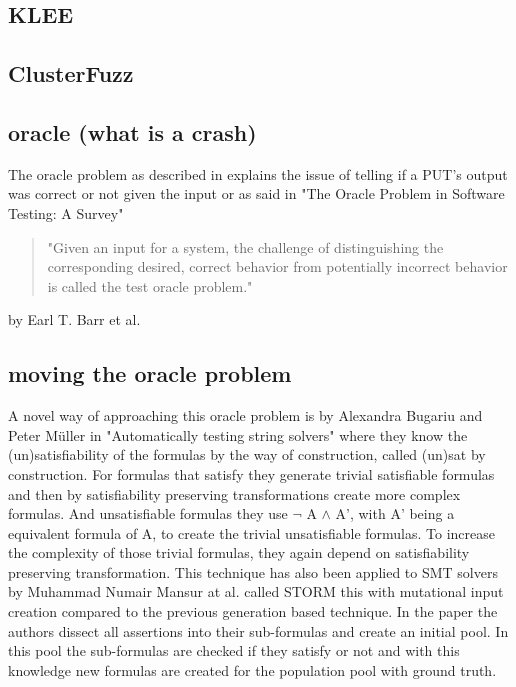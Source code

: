 \subsection{KLEE}
\subsection{ClusterFuzz}


\subsection{oracle (what is a crash)}
The oracle problem as described in \cite{23OriginalOraclePaper} explains the issue of telling if a PUT's output was correct or not given the input or as said in "The Oracle Problem in Software Testing: A Survey"\cite{10barr2014oracleProblem} 
\begin{quote}
	"Given an input for a system,
	the challenge of distinguishing the corresponding desired, correct behavior from potentially incorrect behavior is called the test oracle problem."
\end{quote} by Earl T. Barr et al.



\subsection{moving the oracle problem}
A novel way of approaching this oracle problem is by Alexandra Bugariu and Peter M\"uller in "Automatically testing string solvers"\cite{9bugariu2020automaticallyTestingStringSolvers} where they know the (un)satisfiability of the formulas by the way of construction, called (un)sat by construction.  For formulas that satisfy they generate trivial satisfiable formulas and then by satisfiability preserving transformations create more complex formulas. And unsatisfiable formulas they use $\neg$ A $\land$ A', with A' being a equivalent formula of A, to create the trivial unsatisfiable formulas. To increase the complexity of those trivial formulas, they again depend on satisfiability preserving transformation.
This technique has also been applied to SMT solvers by Muhammad Numair Mansur at al. called STORM\cite{1mansur2020detecting} this with mutational input creation compared to the previous generation based technique. In the paper the authors dissect all assertions into their sub-formulas and create an initial pool. In this pool the sub-formulas are checked if they satisfy or not and with this knowledge new formulas are created for the population pool with ground truth.


